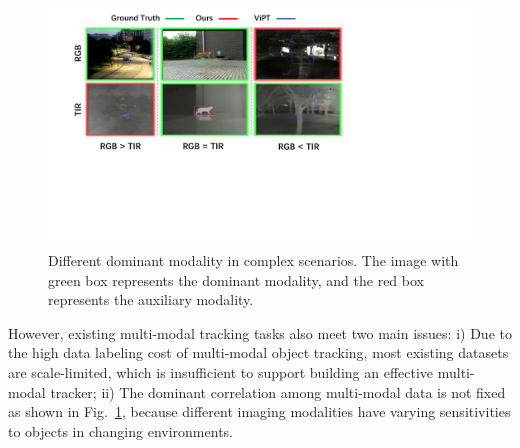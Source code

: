 \documentclass[letterpaper]{article} %
\begin{document}
\begin{figure}[t]
\centering
\includegraphics[width=1\columnwidth]{Figures/Figure1.pdf} 
\caption{Different dominant modality in complex scenarios. The image with green box represents the dominant modality, and the red box represents the auxiliary modality.
}
\label{fig:dynamic}
\end{figure}



However, existing multi-modal tracking tasks also meet two main issues: i)
Due to the high data labeling cost of multi-modal object tracking, most existing datasets are scale-limited, which is insufficient to support building an effective multi-modal tracker;
ii) The dominant correlation among multi-modal data is not fixed as shown in Fig.~\ref{fig:dynamic}, because different imaging modalities have varying sensitivities to objects in changing environments.
\end{document}
